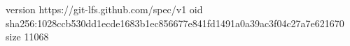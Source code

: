 version https://git-lfs.github.com/spec/v1
oid sha256:1028ccb530dd1ecde1683b1ec856677e841fd1491a0a39ac3f04c27a7e621670
size 11068
